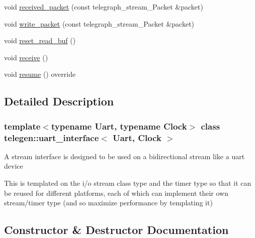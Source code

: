 \begin{DoxyCompactItemize}
\item 
void \hyperlink{classtelegen_1_1uart__interface_a7b7a2f161f41a0bea021876ba459c910}{received\+\_\+packet} (const telegraph\+\_\+stream\+\_\+\+Packet \&packet)
\item 
void \hyperlink{classtelegen_1_1uart__interface_af9ddca9952736ea442f0324cac0c1087}{write\+\_\+packet} (const telegraph\+\_\+stream\+\_\+\+Packet \&packet)
\item 
void \hyperlink{classtelegen_1_1uart__interface_a83061b24c65c0c50d89635af69fb1172}{reset\+\_\+read\+\_\+buf} ()
\item 
void \hyperlink{classtelegen_1_1uart__interface_ac126173cdd9ffe15a33e248dc3e8c2fc}{receive} ()
\item 
void \hyperlink{classtelegen_1_1uart__interface_acc4f7dbff9e17b04a55ece5f447272df}{resume} () override
\end{DoxyCompactItemize}


\subsection{Detailed Description}
\subsubsection*{template$<$typename Uart, typename Clock$>$\newline
class telegen\+::uart\+\_\+interface$<$ Uart, Clock $>$}

A stream interface is designed to be used on a bidirectional stream like a uart device

This is templated on the i/o stream class type and the timer type so that it can be reused for different platforms, each of which can implement their own stream/timer type (and so maximize performance by templating it) 

\subsection{Constructor \& Destructor Documentation}
\mbox{\label{classtelegen_1_1uart__interface_a94948855fab15839bd7af6325b7de8ab}} 
